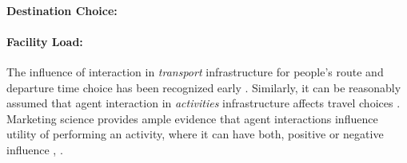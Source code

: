 \paragraph{Destination Choice:}
%
%
%


\paragraph{Facility Load:}
The influence of interaction in \emph{transport} infrastructure for people's route and departure time choice has been recognized early \citep[e.\,g.,][]{Pigou_1920, Knight_QJE_1924, Wardrop_PICE_1952}. Similarly, it can be reasonably assumed that agent interaction in \emph{activities} infrastructure affects travel choices \citep[][]{Axhausen_SSRL_2006}. Marketing science provides ample evidence that agent interactions influence utility of performing an activity, where it can have both, positive or negative influence \citep[][p.331]{BakerJEtAl_JAMS_1994}, \citep[][]{ErogluAndHarrell_JR_1986, ErogluAndMachleit_JR_1990, ErogluEtAl_JBR_2005, HarrellEtAl_JMR_1980, HuiAndBateson_JCR_1991, PonsEtAl_PsychMark_2006}.

